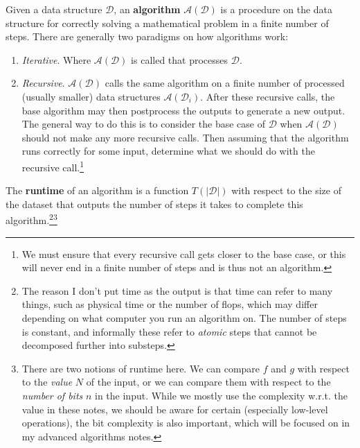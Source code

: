 \documentclass{article}
\begin{document}
  \begin{definition}[Algorithm]
    Given a data structure $\mathcal{D}$, an \textbf{algorithm} $\mathcal{A}(\mathcal{D})$ is a procedure on the data structure for correctly solving a mathematical problem in a finite number of steps. There are generally two paradigms on how algorithms work: 
    \begin{enumerate}
      \item \textit{Iterative}. Where $\mathcal{A}(\mathcal{D})$ is called that processes $\mathcal{D}$. 
      \item \textit{Recursive}. $\mathcal{A}(\mathcal{D})$ calls the same algorithm on a finite number of processed (usually smaller) data structures $\mathcal{A}(\mathcal{D}_i)$. After these recursive calls, the base algorithm may then postprocess the outputs to generate a new output. The general way to do this is to consider the base case of $\mathcal{D}$ when $\mathcal{A}(\mathcal{D})$ should not make any more recursive calls. Then assuming that the algorithm runs correctly for some input, determine what we should do with the recursive call.\footnote{We must ensure that every recursive call gets closer to the base case, or this will never end in a finite number of steps and is thus not an algorithm. }
    \end{enumerate}
    The \textbf{runtime} of an algorithm is a function $T(|\mathcal{D}|)$ with respect to the size of the dataset that outputs the number of steps it takes to complete this algorithm.\footnote{The reason I don't put time as the output is that time can refer to many things, such as physical time or the number of flops, which may differ depending on what computer you run an algorithm on. The number of steps is constant, and informally these refer to \textit{atomic} steps that cannot be decomposed further into substeps.}\footnote{There are two notions of runtime here. We can compare $f$ and $g$ with respect to the \textit{value} $N$ of the input, or we can compare them with respect to the \textit{number of bits} $n$ in the input. While we mostly use the complexity w.r.t. the value in these notes, we should be aware for certain (especially low-level operations), the bit complexity is also important, which will be focused on in my advanced algorithms notes. }
  \end{definition}
\end{document}
